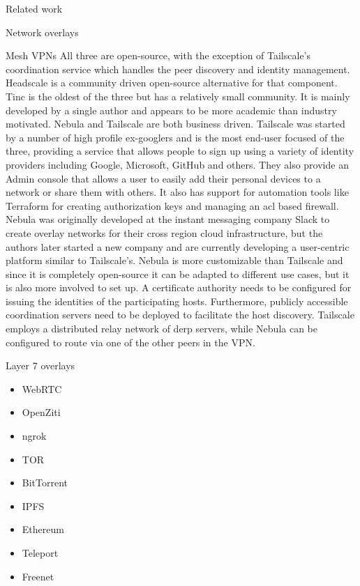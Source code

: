 \begin{frame}[fragile]{Related work}
\begin{block}{Network overlays}
\begin{block}{Mesh VPNs}
All three are open-source, with the exception of Tailscale's
coordination service which handles the peer discovery and identity
management. Headscale \autocite{fontJuanfontHeadscale2022} is a
community driven open-source alternative for that component. Tinc is the
oldest of the three but has a relatively small community. It is mainly
developed by a single author and appears to be more academic than
industry motivated. Nebula and Tailscale are both business driven.
Tailscale was started by a number of high profile ex-googlers and is the
most end-user focused of the three, providing a service that allows
people to sign up using a variety of identity providers including
Google, Microsoft, GitHub and others. They also provide an Admin console
that allows a user to easily add their personal devices to a network or
share them with others. It also has support for automation tools like
Terraform for creating authorization keys and managing an \gls{acl}
based firewall. Nebula was originally developed at the instant messaging
company Slack to create overlay networks for their cross region cloud
infrastructure, but the authors later started a new company and are
currently developing a user-centric platform similar to Tailscale's.
Nebula is more customizable than Tailscale and since it is completely
open-source it can be adapted to different use cases, but it is also
more involved to set up. A certificate authority needs to be configured
for issuing the identities of the participating hosts. Furthermore,
publicly accessible coordination servers need to be deployed to
facilitate the host discovery. Tailscale employs a distributed relay
network of \gls{derp} servers, while Nebula can be configured to route
via one of the other peers in the VPN.
\end{block}

\begin{block}{Layer 7 overlays}
\protect\hypertarget{layer-7-overlays}{}
\begin{itemize}
\tightlist
\item
  WebRTC
\item
  OpenZiti
\item
  ngrok
\item
  TOR
\item
  BitTorrent
\item
  IPFS
\item
  Ethereum
\item
  Teleport
\item
  Freenet
\end{itemize}
\end{block}
\end{block}
\end{frame}

